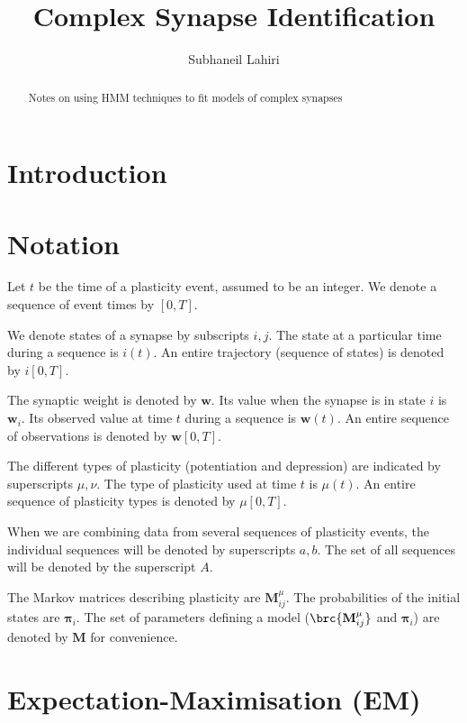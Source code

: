 \documentclass[12pt]{article}
\title{Complex Synapse Identification}%
\author{Subhaneil Lahiri}%
\newcommand{\pib}{\boldsymbol{\pi}}
\newcommand{\w}{\mathbf{w}}
\newcommand{\M}{\mathbf{M}}
\begin{document}
\maketitle
\begin{abstract}
  Notes on using HMM techniques to fit models of complex synapses
\end{abstract}

\section{Introduction \label{sec:intro}}






\section{Notation \label{sec:notation}}

Let $t$ be the time of a plasticity event, assumed to be an integer. 
We denote a sequence of event times by $[0,T]$.

We denote states of a synapse by subscripts $i,j$. 
The state at a particular time during a sequence is $i(t)$.
An entire trajectory (sequence of states) is denoted by $i[0,T]$.

The synaptic weight is denoted by $\w$.
Its value when the synapse is in state $i$ is $\w_i$.
Its observed value at time $t$ during a sequence is $\w(t)$.
An entire sequence of observations is denoted by $\w[0,T]$.

The different types of plasticity (\eg potentiation and depression) are indicated by superscripts $\mu,\nu$.
The type of plasticity used at time $t$ is $\mu(t)$.
An entire sequence of plasticity types is denoted by $\mu[0,T]$.

When we are combining data from several sequences of plasticity events, the individual sequences will be denoted by superscripts $a,b$.
The set of all sequences will be denoted by the superscript $A$.

The Markov matrices describing plasticity are $\M^\mu_{ij}$.
The probabilities of the initial states are $\pib_i$.
The set of parameters defining a model (\ie $\brc{\M^\mu_{ij}}$ and $\pib_i$) are denoted by $\M$ for convenience.


\section{Expectation-Maximisation (EM) \label{sec:em}}
\end{document}
